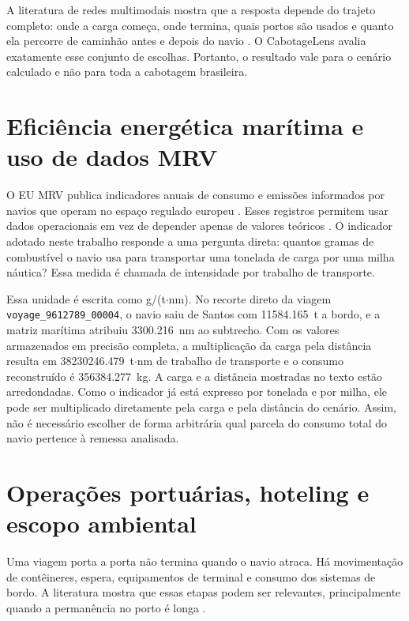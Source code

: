 \documentclass[12pt,a4paper]{report}
\begin{document}
A literatura de redes multimodais mostra que a resposta depende do trajeto completo: onde a carga começa, onde termina, quais portos são usados e quanto ela percorre de caminhão antes e depois do navio \citep{competitiveness2024}. O CabotageLens avalia exatamente esse conjunto de escolhas. Portanto, o resultado vale para o cenário calculado e não para toda a cabotagem brasileira.

\section{Eficiência energética marítima e uso de dados MRV}

O EU MRV publica indicadores anuais de consumo e emissões informados por navios que operam no espaço regulado europeu \citep{eumrv2025}. Esses registros permitem usar dados operacionais em vez de depender apenas de valores teóricos \citep{drybulk2019}. O indicador adotado neste trabalho responde a uma pergunta direta: quantos gramas de combustível o navio usa para transportar uma tonelada de carga por uma milha náutica? Essa medida é chamada de intensidade por trabalho de transporte.

Essa unidade é escrita como g/(t$\cdot$nm). No recorte direto da viagem \texttt{voyage\_9612789\_00004}, o navio saiu de Santos com \num{11584.165}~t a bordo, e a matriz marítima atribuiu \num{3300.216}~nm ao subtrecho. Com os valores armazenados em precisão completa, a multiplicação da carga pela distância resulta em \num{38230246.479}~t$\cdot$nm de trabalho de transporte e o consumo reconstruído é \num{356384.277}~kg. A carga e a distância mostradas no texto estão arredondadas. Como o indicador já está expresso por tonelada e por milha, ele pode ser multiplicado diretamente pela carga e pela distância do cenário. Assim, não é necessário escolher de forma arbitrária qual parcela do consumo total do navio pertence à remessa analisada.

\section{Operações portuárias, hoteling e escopo ambiental}

Uma viagem porta a porta não termina quando o navio atraca. Há movimentação de contêineres, espera, equipamentos de terminal e consumo dos sistemas de bordo. A literatura mostra que essas etapas podem ser relevantes, principalmente quando a permanência no porto é longa \citep{berth2009,shipops2022,rtg2017,hybridrtg2021}.
\end{document}
